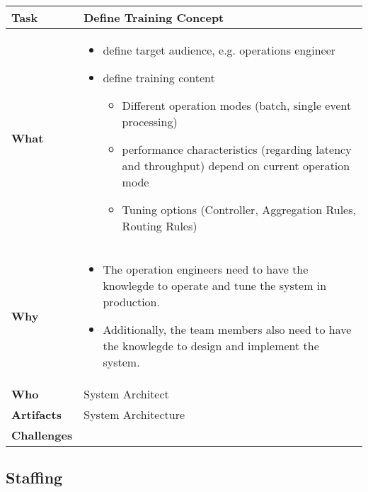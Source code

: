 \begin{tabularx}{\textwidth}{@{} l X @{}}
	\caption{Define Training Concept} \label{table:ch6_Task_Define_Training_Concept}\\
	\toprule 
	\bfseries Task & Define Training Concept\\
	\midrule 
	\bfseries What & 
	\begin{itemize}
		\item define target audience, e.g. operations engineer
		\item define training content
		\begin{itemize}
			\item Different operation modes (batch, single event processing)
			\item performance characteristics (regarding latency and throughput) depend on current operation mode
			\item Tuning options (Controller, Aggregation Rules, Routing Rules)
		\end{itemize}
	\end{itemize}
	\\
	\midrule 
	\bfseries Why & 
	\begin{itemize}
		\item The operation engineers need to have the knowlegde to operate and tune the system in production.
		\item Additionally, the team members also need to have the knowlegde to design and implement the system.
	\end{itemize}
	\\
	\midrule 
	\bfseries Who & System Architect\\
	\midrule 
	\bfseries Artifacts & System Architecture\\
	\midrule 
	\bfseries Challenges & \\
	\bottomrule 
\end{tabularx}


\subsection{Staffing}

